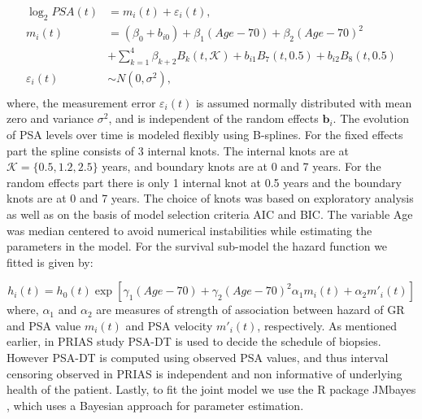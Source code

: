 \begin{equation*}
\begin{aligned}
\log_2 PSA(t) &= m_i(t) + \varepsilon_i(t), \\
m_i(t) &= (\beta_0 + b_{i0}) + \beta_1 (Age-70) + \beta_2 (Age-70)^2\\ 
&+ \sum_{k=1}^4 \beta_{k+2} B_k(t,\mathcal{K}) + b_{i1} B_7(t, 0.5) + b_{i2} B_8(t, 0.5) \\
\varepsilon_i(t) & \sim N(0, \sigma^2),\\
\end{aligned}
\end{equation*}
where, the measurement error $\varepsilon_i(t)$ is assumed normally distributed with mean zero and variance $\sigma^2$, and is independent of the random effects $\boldsymbol{b}_i$. The evolution of PSA levels over time is modeled flexibly using B-splines. For the fixed effects part the spline consists of 3 internal knots. The internal knots are at $\mathcal{K} =\{0.5, 1.2, 2.5\}$ years, and boundary knots are at 0 and 7 years. For the random effects part there is only 1 internal knot at 0.5 years and the boundary knots are at 0 and 7 years. The choice of knots was based on exploratory analysis as well as on the basis of model selection criteria AIC and BIC. The variable Age was median centered to avoid numerical instabilities while estimating the parameters in the model. For the survival sub-model the hazard function we fitted is given by:

\begin{equation}
\label{eq : hazard_prias}
h_i(t) = h_0(t) \exp[\gamma_1 (Age-70)  + \gamma_2 (Age-70)^2  \alpha_1 m_i(t) + \alpha_2 m'_i(t)]
\end{equation}
where, $\alpha_1$ and $\alpha_2$ are measures of strength of association between hazard of GR and PSA value $m_i(t)$ and PSA velocity $m'_i(t)$, respectively. As mentioned earlier, in PRIAS study PSA-DT is used to decide the schedule of biopsies. However PSA-DT is computed using observed PSA values, and thus interval censoring observed in PRIAS is independent and non informative of underlying health of the patient. Lastly, to fit the joint model we use the R package JMbayes \cite{rizopoulosJMbayes}, which uses a Bayesian approach for parameter estimation.

